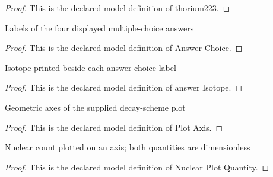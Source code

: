 \begin{proof}
  This is the declared model definition of thorium223.
\end{proof}
\begin{definition}
  \label{def:physics:phyx-mini-0574:phyxminiproblems-problemphyxmini0574-answerchoice}
  Labels of the four displayed multiple-choice answers
\end{definition}
\begin{proof}
  This is the declared model definition of Answer Choice.
\end{proof}
\begin{definition}
  \label{def:physics:phyx-mini-0574:phyxminiproblems-problemphyxmini0574-answerisotope}
  Isotope printed beside each answer-choice label
\end{definition}
\begin{proof}
  This is the declared model definition of answer Isotope.
\end{proof}
\begin{definition}
  \label{def:physics:phyx-mini-0574:phyxminiproblems-problemphyxmini0574-plotaxis}
  Geometric axes of the supplied decay-scheme plot
\end{definition}
\begin{proof}
  This is the declared model definition of Plot Axis.
\end{proof}
\begin{definition}
  \label{def:physics:phyx-mini-0574:phyxminiproblems-problemphyxmini0574-nuclearplotquantity}
  Nuclear count plotted on an axis; both quantities are dimensionless
\end{definition}
\begin{proof}
  This is the declared model definition of Nuclear Plot Quantity.
\end{proof}
